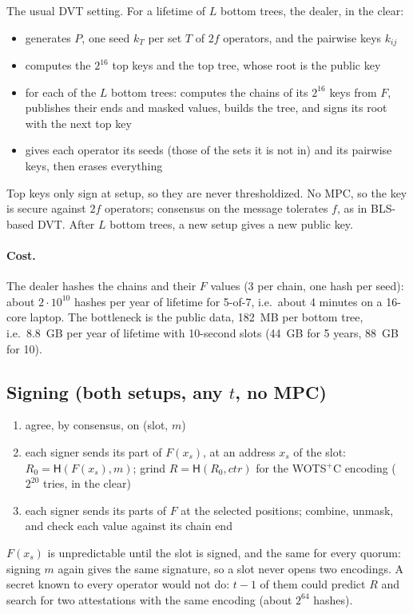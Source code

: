 \documentclass[11pt]{article}
\newcommand{\hash}{\mathsf{H}}
\begin{document}
The usual DVT setting. For a lifetime of $L$ bottom trees, the dealer, in the clear:
\begin{itemize}
  \item generates $P$, one seed $k_T$ per set $T$ of $2f$ operators, and the pairwise keys $k_{ij}$
  \item computes the $2^{16}$ top keys and the top tree, whose root is the public key
  \item for each of the $L$ bottom trees: computes the chains of its $2^{16}$ keys from $F$, publishes
        their ends and masked values, builds the tree, and signs its root with the next top key
  \item gives each operator its seeds (those of the sets it is not in) and its pairwise keys, then
        erases everything
\end{itemize}
Top keys only sign at setup, so they are never thresholdized. No MPC, so the key is secure against $2f$
operators; consensus on the message tolerates $f$, as in BLS-based DVT. After $L$ bottom trees, a new
setup gives a new public key.

\paragraph{Cost.} The dealer hashes the chains and their $F$ values (3 per chain, one hash per seed): about
$2\cdot10^{10}$ hashes per year of lifetime for 5-of-7, i.e.\ about 4 minutes on a 16-core laptop. The bottleneck is the public data, 182~MB per bottom tree,
i.e.\ 8.8~GB per year of lifetime with 10-second slots (44~GB for 5 years, 88~GB for 10).

\subsection{\texorpdfstring{Signing (both setups, any $t$, no MPC)}{Signing (both setups, any t, no MPC)}}

\begin{enumerate}
  \item agree, by consensus, on (slot, $m$)
  \item each signer sends its part of $F(x_s)$, at an address $x_s$ of the slot: $R_0=\hash(F(x_s),m)$; grind
        $R=\hash(R_0,\mathit{ctr})$ for the WOTS$^+$C encoding ($2^{20}$ tries, in the clear)
  \item each signer sends its parts of $F$ at the selected positions; combine, unmask, and check each value
        against its chain end
\end{enumerate}
$F(x_s)$ is unpredictable until the slot is signed, and the same for every quorum: signing $m$ again gives
the same signature, so a slot never opens two encodings. A secret known to every operator would not do:
$t-1$ of them could predict $R$ and search for two attestations with the same encoding (about $2^{64}$
hashes).
\end{document}
